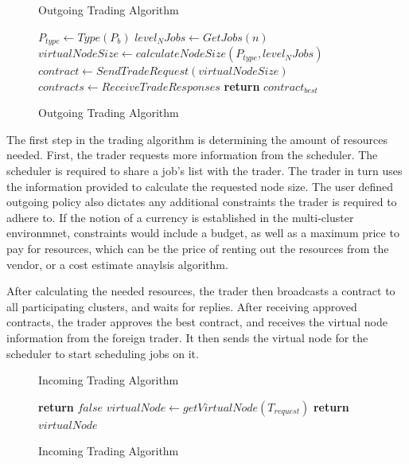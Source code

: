 \begin{figure}[H]
\begin{algorithm}[H]
\caption{Outgoing Trading Algorithm}
\begin{algorithmic}
   
    \State $P_{type} \gets Type(P_b)$
    \State $level_N Jobs \gets GetJobs(n)$ 
    \State $virtualNodeSize \gets calculateNodeSize(P_{type}, level_N Jobs)$
      \State $contract \gets SendTradeRequest(virtualNodeSize)$
    \EndFor
    \State $contracts \gets ReceiveTradeResponses$ 
    \State \textbf{return} $contract_{best}$
    
  \EndProcedure
\end{algorithmic}
\end{algorithm}
\caption{Outgoing Trading Algorithm}
\end{figure}

The first step in the trading algorithm is determining the amount of resources
needed. First, the trader requests more information from the scheduler. The
scheduler is required to share a job's list with the trader. The trader in turn
uses the information provided to calculate the requested node size. The user
defined outgoing policy also dictates any additional constraints the trader is
required to adhere to. If the notion of a currency is established in the
multi-cluster environmnet, constraints would include a budget, as well as a
maximum price to pay for resources, which can be the price of renting out the
resources from the vendor, or a cost estimate anaylsis algorithm. 

After calculating the needed resources, the trader then broadcasts a contract
to all participating clusters, and waits for replies. After receiving approved
contracts, the trader approves the best contract, and receives the virtual node
information from the foreign trader. It then sends the virtual node for the
scheduler to start scheduling jobs on it.

\begin{figure}[H]
\begin{algorithm}[H]
\caption{Incoming Trading Algorithm}
\begin{algorithmic}
   
       
      \State \textbf{return} $false$ 
      \EndIf
    \EndFor
    \State $virtualNode \gets getVirtualNode(T_{request})$     
    \State \textbf{return} $virtualNode$ 
  \EndProcedure
\end{algorithmic}
\end{algorithm}
\caption{Incoming Trading Algorithm}
\end{figure}

